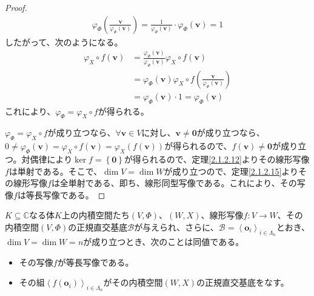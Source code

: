 \documentclass[dvipdfmx]{jsarticle}
\begin{document}
\begin{proof}
\begin{align*}
\varphi_{\varPhi }\left( \frac{\mathbf{v}}{\varphi_{\varPhi }\left( \mathbf{v} \right)} \right) = \frac{1}{\varphi_{\varPhi }\left( \mathbf{v} \right)} \cdot \varphi_{\varPhi }\left( \mathbf{v} \right) = 1
\end{align*}
したがって、次のようになる。
\begin{align*}
\varphi_{X} \circ f\left( \mathbf{v} \right) &= \frac{\varphi_{\varPhi }\left( \mathbf{v} \right)}{\varphi_{\varPhi }\left( \mathbf{v} \right)}\varphi_{X} \circ f\left( \mathbf{v} \right)\\
&= \varphi_{\varPhi }\left( \mathbf{v} \right)\varphi_{X} \circ f\left( \frac{\mathbf{v}}{\varphi_{\varPhi }\left( \mathbf{v} \right)} \right)\\
&= \varphi_{\varPhi }\left( \mathbf{v} \right) \cdot 1 = \varphi_{\varPhi }\left( \mathbf{v} \right)
\end{align*}
これにより、$\varphi_{\varPhi } = \varphi_{X} \circ f$が得られる。\par
$\varphi_{\varPhi } = \varphi_{X} \circ f$が成り立つなら、$\forall\mathbf{v} \in V$に対し、$\mathbf{v} \neq \mathbf{0}$が成り立つなら、$0 \neq \varphi_{\varPhi }\left( \mathbf{v} \right) = \varphi_{X} \circ f\left( \mathbf{v} \right) = \varphi_{X}\left( f\left( \mathbf{v} \right) \right)$が得られるので、$f\left( \mathbf{v} \right) \neq \mathbf{0}$が成り立つ。対偶律により$\ker f = \left\{ \mathbf{0} \right\}$が得られるので、定理\ref{2.1.2.12}よりその線形写像$f$は単射である。そこで、$\dim V = \dim W$が成り立つので、定理\ref{2.1.2.15}よりその線形写像$f$は全単射である、即ち、線形同型写像である。これにより、その写像$f$は等長写像である。
\end{proof}
\begin{thm}\label{2.3.7.5}
$K \subseteq \mathbb{C}$なる体$K$上の内積空間たち$(V,\varPhi )$、$(W,X)$、線形写像$f:V \rightarrow W$、その内積空間$(V,\varPhi )$の正規直交基底$\mathcal{B}$が与えられ、さらに、$\mathcal{B} =\left\langle \mathbf{o}_{i} \right\rangle_{i \in \varLambda_{n}}$とおき、$\dim V = \dim W = n$が成り立つとき、次のことは同値である。
\begin{itemize}
\item
  その写像$f$が等長写像である。
\item
  その組$\left\langle f\left( \mathbf{o}_{i} \right) \right\rangle_{i \in \varLambda_{n}}$がその内積空間$(W,X)$の正規直交基底をなす。
\end{itemize}
\end{thm}
\end{document}
